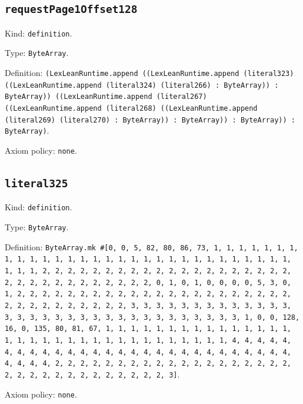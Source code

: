 \documentclass[11pt]{article}
\begin{document}
\subsection*{\texttt{requestPage1Offset128}}
\noindent Kind: \texttt{definition}.\par
\noindent Type: \texttt{ByteArray}.\par
\noindent Definition: \texttt{(LexLeanRuntime.append ((LexLeanRuntime.append (literal323) ((LexLeanRuntime.append (literal324) (literal266) : ByteArray)) : ByteArray)) ((LexLeanRuntime.append (literal267) ((LexLeanRuntime.append (literal268) ((LexLeanRuntime.append (literal269) (literal270) : ByteArray)) : ByteArray)) : ByteArray)) : ByteArray)}.\par
\noindent Axiom policy: \texttt{none}.\par
\subsection*{\texttt{literal325}}
\noindent Kind: \texttt{definition}.\par
\noindent Type: \texttt{ByteArray}.\par
\noindent Definition: \texttt{ByteArray.mk \#[0, 0, 5, 82, 80, 86, 73, 1, 1, 1, 1, 1, 1, 1, 1, 1, 1, 1, 1, 1, 1, 1, 1, 1, 1, 1, 1, 1, 1, 1, 1, 1, 1, 1, 1, 1, 1, 1, 1, 1, 2, 2, 2, 2, 2, 2, 2, 2, 2, 2, 2, 2, 2, 2, 2, 2, 2, 2, 2, 2, 2, 2, 2, 2, 2, 2, 2, 2, 2, 2, 2, 2, 0, 1, 0, 1, 0, 0, 0, 0, 5, 3, 0, 1, 2, 2, 2, 2, 2, 2, 2, 2, 2, 2, 2, 2, 2, 2, 2, 2, 2, 2, 2, 2, 2, 2, 2, 2, 2, 2, 2, 2, 2, 2, 2, 2, 3, 3, 3, 3, 3, 3, 3, 3, 3, 3, 3, 3, 3, 3, 3, 3, 3, 3, 3, 3, 3, 3, 3, 3, 3, 3, 3, 3, 3, 3, 3, 3, 1, 0, 0, 128, 16, 0, 135, 80, 81, 67, 1, 1, 1, 1, 1, 1, 1, 1, 1, 1, 1, 1, 1, 1, 1, 1, 1, 1, 1, 1, 1, 1, 1, 1, 1, 1, 1, 1, 1, 1, 1, 1, 1, 4, 4, 4, 4, 4, 4, 4, 4, 4, 4, 4, 4, 4, 4, 4, 4, 4, 4, 4, 4, 4, 4, 4, 4, 4, 4, 4, 4, 4, 4, 4, 4, 2, 2, 2, 2, 2, 2, 2, 2, 2, 2, 2, 2, 2, 2, 2, 2, 2, 2, 2, 2, 2, 2, 2, 2, 2, 2, 2, 2, 2, 2, 2, 2, 3]}.\par
\noindent Axiom policy: \texttt{none}.\par
\end{document}
